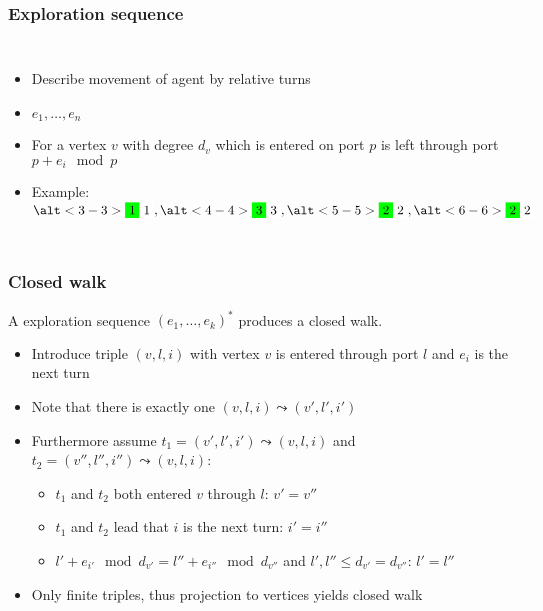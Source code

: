 \documentclass{beamer}
\begin{document}
\begin{frame}
  \frametitle{Exploration sequence}
  \begin{columns}
    \begin{itemize}
      \item Describe movement of agent by relative turns
      \item $e_{1},\dots, e_{n}$
      \item For a vertex $v$ with degree $d_{v}$ which is entered on port $p$
        is left through port $p + e_{i}\mod p$
      \item<2->[$\rightarrow$] Example:
        $\alt<3-3>{\colorbox{green}{1}}{\colorbox{white!0}{1}},
        \alt<4-4>{\colorbox{green}{3}}{\colorbox{white!0}{3}},
        \alt<5-5>{\colorbox{green}{2}}{\colorbox{white!0}{2}},
        \alt<6-6>{\colorbox{green}{2}}{\colorbox{white!0}{2}}$
    \end{itemize}
    \begin{center}
      \resizebox{\textwidth}{!}{}
    \end{center}
  \end{columns}
\end{frame}

\begin{frame}
  \frametitle{Closed walk}
  \begin{theorem}
    A exploration sequence $(e_{1},\dots,e_{k})^{\ast}$ produces a closed walk.
  \end{theorem}
  \begin{itemize}
    \item Introduce triple $(v,l,i)$ with vertex $v$ is entered
      through port $l$ and $e_{i}$ is the next turn
    \item Note that there is exactly one $(v,l,i) \leadsto (v',l',i')$
    \item Furthermore assume $t_{1} = (v',l',i') \leadsto (v,l,i)$ and
      $t_{2} = (v'',l'',i'') \leadsto (v,l,i)$:
      \begin{itemize}
        \item $t_{1}$ and $t_{2}$ both entered $v$ through $l$: $v' = v''$
        \item $t_{1}$ and $t_{2}$ lead that $i$ is the next turn: $i' = i''$
        \item $l' + e_{i'} \mod d_{v'} = l'' + e_{i''} \mod d_{v''}$ and
          $l',l''\leq d_{v'} = d_{v''}$: $l' = l''$
      \end{itemize}
    \item Only finite triples, thus projection to vertices yields closed walk
  \end{itemize}
\end{frame}
\end{document}
